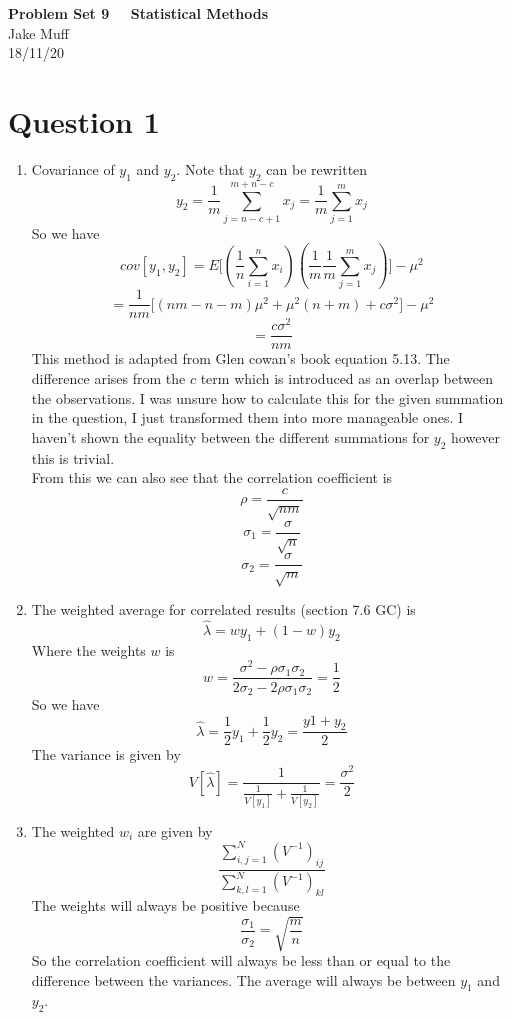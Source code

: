 \documentclass[12pt]{article}
\begin{document}
\normalsize

\baselineskip 14pt

\begin{center}
{\Large {\bf Problem Set 9 \ \ Statistical Methods}} \\
Jake Muff \\
18/11/20
\end{center}

\section{Question 1}

\begin{enumerate}
    \item Covariance of $y_1$ and $y_2$. Note that $y_2$ can be rewritten 
    $$ y_2 = \frac{1}{m} \sum_{j=n-c+1}^{m+n-c} x_j = \frac{1}{m} \sum_{j=1}^{m} x_j $$
    So we have 
    $$ cov[y_1, y_2] = E \big[ ( \frac{1}{n} \sum_{i=1}^n x_i ) ( \frac{1}{m} \frac{1}{m} \sum_{j=1}^{m} x_j)] - \mu^2 $$
    $$ = \frac{1}{nm} \Big[ (nm -n-m)\mu^2 + \mu^2(n+m) + c\sigma^2]-\mu^2 $$
    $$ = \frac{c \sigma^2}{nm} $$
    This method is adapted from Glen cowan's book equation 5.13. The difference arises from the $c$ term which is introduced as an overlap between the observations. I was unsure how to calculate this for the given summation in the question, I just transformed them into more manageable ones. I haven't shown the equality between the different summations for $y_2$ however this is trivial. 
    \\
    From this we can also see that the correlation coefficient is 
    $$ \rho = \frac{c}{\sqrt{nm}} $$
    $$ \sigma_1 = \frac{\sigma}{\sqrt{n}} $$
    $$ \sigma_2 = \frac{\sigma}{\sqrt{m}} $$


    \item The weighted average for correlated results (section 7.6 GC) is
    $$ \hat{\lambda} = w y_1 + (1-w) y_2 $$
    Where the weights $w$ is 
    $$ w =\frac{\sigma^2 - \rho \sigma_1 \sigma_2}{2 \sigma_2 - 2 \rho \sigma_1 \sigma_2 } = \frac{1}{2} $$
    So we have 
    $$ \hat{\lambda} = \frac{1}{2} y_1 + \frac{1}{2} y_2 = \frac{y1 + y_2}{2} $$
    The variance is given by 
    $$ V [ \hat{\lambda} ] = \frac{1}{\frac{1}{V[y_1]} + \frac{1}{V[y_2]}} = \frac{\sigma^2}{2} $$

    \item The weighted $w_i$ are given by 
    $$ \frac{ \sum_{i,j=1}^N ( V^{-1})_{ij} }{\sum_{k,l=1}^N (V^{-1})_{kl} } $$
    The weights will always be positive because 
    $$ \frac{\sigma_1}{\sigma_2} = \sqrt{\frac{m}{n}} $$
    So the correlation coefficient will always be less than or equal to the difference between the variances. The average will always be between $y_1$ and $y_2$. 


\end{enumerate}
\end{document}
